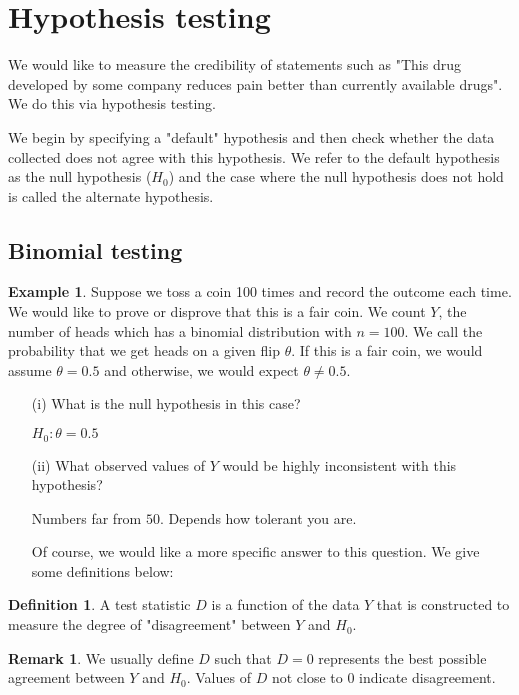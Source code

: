 \documentclass[11pt]{amsart}
\theoremstyle{definition}
\newtheorem{definition}[theorem]{Definition}
\newtheorem{remark}[theorem]{Remark}
\newtheorem{example}[theorem]{Example}
\numberwithin{equation}{section}
\begin{document}
\section{Hypothesis testing}
We would like to measure the credibility of statements such as "This drug developed by some company reduces pain better than currently available drugs". We do this via hypothesis testing.

We begin by specifying a "default" hypothesis and then check whether the data collected does not agree with this hypothesis. We refer to the default hypothesis as the null hypothesis ($H_0$) and the case where the null hypothesis does not hold is called the alternate hypothesis.
\subsection{Binomial testing}
\begin{example}
    Suppose we toss a coin 100 times and record the outcome each time. We would like to prove or disprove that this is a fair coin. We count $Y$, the number of heads which has a binomial distribution with $n=100$. We call the probability that we get heads on a given flip $\theta$. If this is a fair coin, we would assume $\theta=0.5$ and otherwise, we would expect $\theta\ne0.5$.
    \begin{enumerate}
        \item [(i)] What is the null hypothesis in this case?

        $H_0:\theta=0.5$
        \item [(ii)] What observed values of $Y$ would be highly inconsistent with this hypothesis?

        Numbers far from $50$. Depends how tolerant you are.

        Of course, we would like a more specific answer to this question. We give some definitions below:
    \end{enumerate}
\end{example}
\begin{definition}
    A test statistic $D$ is a function of the data $Y$ that is constructed to measure the degree of "disagreement" between $Y$ and $H_0$.
\end{definition}
\begin{remark}
    We usually define $D$ such that $D=0$ represents the best possible agreement between $Y$ and $H_0$. Values of $D$ not close to 0 indicate disagreement.
\end{remark}
\end{document}
